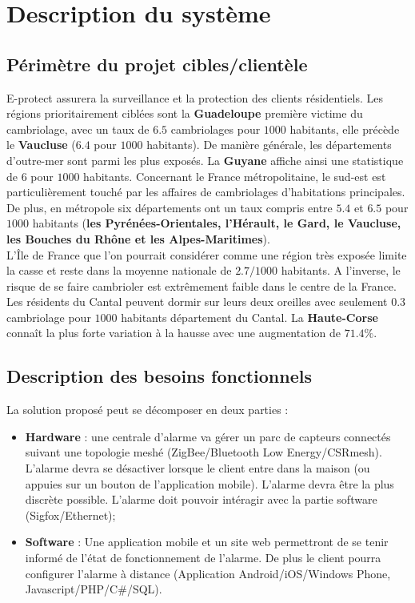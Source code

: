 \chapter{Description du système}

\section{Périmètre du projet cibles/clientèle}

E-protect assurera la surveillance et la protection des clients résidentiels. Les régions prioritairement ciblées sont la \textbf{Guadeloupe} première victime du cambriolage, avec un taux de $6.5$ cambriolages pour $1000$ habitants, elle précède le \textbf{Vaucluse} ($6.4$ pour $1000$ habitants). De manière générale, les départements d’outre-mer sont parmi les plus exposés. La \textbf{Guyane} affiche ainsi une statistique de 6 pour $1000$ habitants. Concernant le France métropolitaine, le sud-est est particulièrement touché par les affaires de cambriolages d’habitations principales.\\

De plus, en métropole six départements ont un taux compris entre $5.4$ et $6.5$ pour $1000$ habitants (\textbf{les Pyrénées-Orientales, l’Hérault, le Gard, le Vaucluse, les Bouches du Rhône et les Alpes-Maritimes}).\\

L’Île de France que l’on pourrait considérer comme une région très exposée limite la casse et reste dans la moyenne nationale de $2.7/1000$ habitants. A l’inverse, le risque de se faire cambrioler est extrêmement faible dans le centre de la France. Les résidents du Cantal peuvent dormir sur leurs deux oreilles avec seulement $0.3$ cambriolage pour $1000$ habitants département du Cantal. La \textbf{Haute-Corse} connaît la plus forte variation à la hausse avec une augmentation de $71.4\%$.\cite{www:ONDRP}\\



\section{Description des besoins fonctionnels}


La solution proposé peut se décomposer en deux parties :
\begin{itemize}
\item \textbf{Hardware} : une centrale d'alarme va gérer un parc de capteurs connectés suivant une topologie meshé (ZigBee/Bluetooth Low Energy/CSRmesh). L'alarme devra se désactiver lorsque le client entre dans la maison (ou appuies sur un bouton de l'application mobile). L'alarme devra être la plus discrète possible. L'alarme doit pouvoir intéragir avec la partie software (Sigfox/Ethernet);
\item \textbf{Software} : Une application mobile et un site web permettront de se tenir informé de l'état de fonctionnement de l'alarme. De plus le client pourra configurer l'alarme à distance (Application Android/iOS/Windows Phone, Javascript/PHP/C\#/SQL).
\end{itemize}

